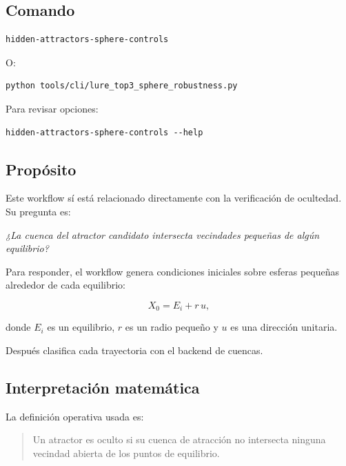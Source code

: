 \documentclass[11pt,letterpaper]{article}
\begin{document}
\subsection{Comando}

\begin{lstlisting}[style=terminal]
hidden-attractors-sphere-controls
\end{lstlisting}

O:

\begin{lstlisting}[style=terminal]
python tools/cli/lure_top3_sphere_robustness.py
\end{lstlisting}

Para revisar opciones:

\begin{lstlisting}[style=terminal]
hidden-attractors-sphere-controls --help
\end{lstlisting}

\subsection{Propósito}

Este workflow sí está relacionado directamente con la verificación de ocultedad. Su pregunta es:

\begin{center}
\textit{¿La cuenca del atractor candidato intersecta vecindades pequeñas de algún equilibrio?}
\end{center}

Para responder, el workflow genera condiciones iniciales sobre esferas pequeñas alrededor de cada equilibrio:

\begin{equation}
X_0 = E_i + r\,u,
\end{equation}

donde $E_i$ es un equilibrio, $r$ es un radio pequeño y $u$ es una dirección unitaria.

Después clasifica cada trayectoria con el backend de cuencas.

\subsection{Interpretación matemática}

La definición operativa usada es:

\begin{quote}
Un atractor es oculto si su cuenca de atracción no intersecta ninguna vecindad abierta de los puntos de equilibrio.
\end{quote}
\end{document}
